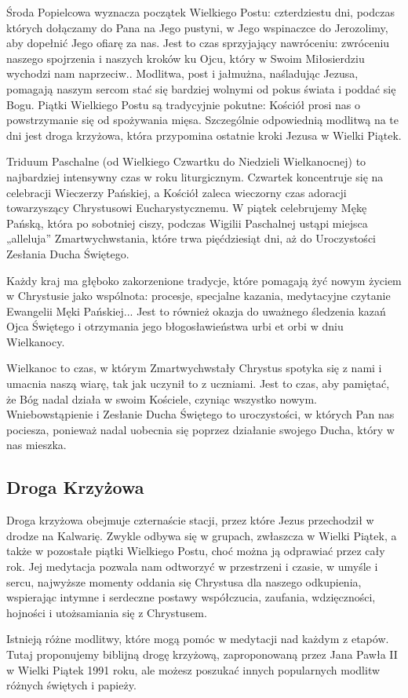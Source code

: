 ﻿\documentclass[9pt,twoside]{extarticle}
\newcommand{\gss}[1]{
  \subsection*{#1}
  \addcontentsline{toc}{subsection}{#1}
  \fancyhead[RO]{\hnb\tiny #1}
}
\begin{document}
{\hnr Środa Popielcowa wyznacza początek Wielkiego Postu: czterdziestu dni, podczas których dołączamy do Pana na Jego pustyni, w Jego wspinaczce do Jerozolimy, aby dopełnić Jego ofiarę za nas. Jest to czas sprzyjający nawróceniu: zwróceniu naszego spojrzenia i naszych kroków ku Ojcu, który w Swoim Miłosierdziu wychodzi nam naprzeciw.. Modlitwa, post i jałmużna, naśladując Jezusa, pomagają naszym sercom stać się bardziej wolnymi od pokus świata i poddać się Bogu. Piątki Wielkiego Postu są tradycyjnie pokutne: Kościół prosi nas o powstrzymanie się od spożywania mięsa. Szczególnie odpowiednią modlitwą na te dni jest droga krzyżowa, która przypomina ostatnie kroki Jezusa w Wielki Piątek.


Triduum Paschalne (od Wielkiego Czwartku do Niedzieli Wielkanocnej) to najbardziej intensywny czas w roku liturgicznym. Czwartek koncentruje się na celebracji Wieczerzy Pańskiej, a Kościół zaleca wieczorny czas adoracji towarzyszący Chrystusowi Eucharystycznemu. W piątek celebrujemy Mękę Pańską, która po sobotniej ciszy, podczas Wigilii Paschalnej ustąpi miejsca „alleluja” Zmartwychwstania, które trwa pięćdziesiąt dni, aż do Uroczystości Zesłania Ducha Świętego.


Każdy kraj ma głęboko zakorzenione tradycje, które pomagają żyć nowym życiem w Chrystusie jako wspólnota: procesje, specjalne kazania, medytacyjne czytanie Ewangelii Męki Pańskiej... Jest to również okazja do uważnego śledzenia kazań Ojca Świętego i otrzymania jego błogosławieństwa urbi et orbi w dniu Wielkanocy.


Wielkanoc to czas, w którym Zmartwychwstały Chrystus spotyka się z nami i umacnia naszą wiarę, tak jak uczynił to z uczniami. Jest to czas, aby pamiętać, że Bóg nadal działa w swoim Kościele, czyniąc wszystko nowym. Wniebowstąpienie i Zesłanie Ducha Świętego to uroczystości, w których Pan nas pociesza, ponieważ nadal uobecnia się poprzez działanie swojego Ducha, który w nas mieszka.}




\gss{Droga Krzyżowa}


{\hnr Droga krzyżowa obejmuje czternaście stacji, przez które Jezus przechodził w drodze na Kalwarię. Zwykle odbywa się w grupach, zwłaszcza w Wielki Piątek, a także w pozostałe piątki Wielkiego Postu, choć można ją odprawiać przez cały rok. Jej medytacja pozwala nam odtworzyć w przestrzeni i czasie, w umyśle i sercu, najwyższe momenty oddania się Chrystusa dla naszego odkupienia, wspierając intymne i serdeczne postawy współczucia, zaufania, wdzięczności, hojności i utożsamiania się z Chrystusem.


Istnieją różne modlitwy, które mogą pomóc w medytacji nad każdym z etapów. Tutaj proponujemy biblijną drogę krzyżową, zaproponowaną przez Jana Pawła II w Wielki Piątek 1991 roku, ale możesz poszukać innych popularnych modlitw różnych świętych i papieży.}
\end{document}
